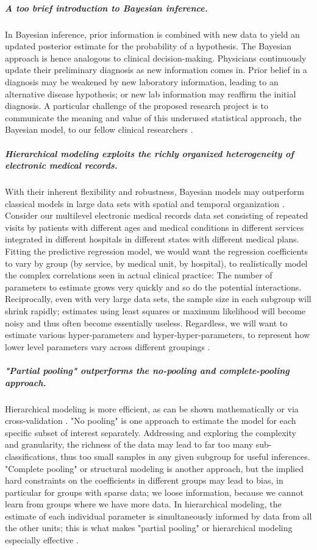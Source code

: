 \documentclass[11pt,notitlepage]{article}
\begin{document}
\subparagraph*{A too brief introduction to Bayesian inference.}
In Bayesian inference, prior information is combined with new data to yield an updated posterior estimate for the probability of a hypothesis. The Bayesian approach is hence analogous to clinical decision-making. Physicians continuously update their preliminary diagnosis as new information comes in. Prior belief in a diagnosis may be weakened by new laboratory information, leading to an alternative disease hypothesis; or new lab information may reaffirm the initial diagnosis. A particular challenge of the proposed research project is to communicate the meaning and value of this underused statistical approach, the Bayesian model, to our fellow clinical researchers \cite{Kruschke_22774788}.

\subparagraph{Hierarchical modeling exploits the richly organized heterogeneity of electronic medical records.}
With their inherent flexibility and robustness, Bayesian models may outperform classical models in large data sets with spatial and temporal organization \cite{Gelman_red_2009}. Consider our multilevel electronic medical records data set consisting of repeated visits by patients with different ages and medical conditions in different services integrated in different hospitals in different states with different medical plans. Fitting the predictive regression model, we would want the regression coefficients to vary by group (by service, by medical unit, by hospital), to realistically model the complex correlations seen in actual clinical practice: The number of parameters to estimate grows very quickly and so do the potential interactions. Reciprocally, even with very large data sets, the sample size in each subgroup will shrink rapidly; estimates using least squares or maximum likelihood will become noisy and thus often become essentially useless. Regardless, we  will want to estimate various hyper-parameters and hyper-hyper-parameters, to represent how lower level parameters vary across different groupings \cite{Bafumi_Gelman_2007}.

\subparagraph*{"Partial pooling" outperforms the no-pooling and complete-pooling approach.}
Hierarchical modeling is more efficient, as can be shown mathematically or via cross-validation \cite{Gelman-Hill_2014}. "No pooling" is one approach to estimate the model for each specific subset of interest separately. Addressing and exploring the complexity and granularity, the richness of the data may lead to far too many sub-classifications, thus too small samples in any given subgroup for useful inferences. "Complete pooling" or structural modeling is another approach, but the implied hard constraints on the coefficients in different groups may lead to bias, in particular for groups with sparse data; we loose information, because we cannot learn from groups where we have more data. In hierarchical modeling, the estimate of each individual parameter is simultaneously informed by data from all the other units; this is what makes "partial pooling" or hierarchical modeling especially effective \cite{Gelman_multilevel_2006}. \newline
\end{document}
